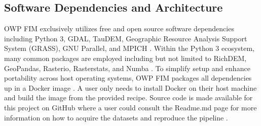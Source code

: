 \documentclass[draft]{dependencies/agujournal2019}
\begin{document}
\subsection{Software Dependencies and Architecture}
\label{ssec:software}
%
OWP FIM exclusively utilizes free and open source software dependencies including Python 3, GDAL, TauDEM, Geographic Resource Analysis Support System (GRASS), GNU Parallel, and MPICH \cite{python382,gdal2020,tarboton2005terrain,grass2020,tange2015gnu,amer2021mpich}.
Within the Python 3 ecosystem, many common packages are employed including but not limited to RichDEM, GeoPandas, Rasterio, Rasterstats, and Numba \cite{barnes2018richdem,jordahl2014geopandas,lam2015numba}. 
To simplify setup and enhance portability across host operating systems, OWP FIM packages all dependencies up in a Docker image \cite{merkel2014docker}. 
A user only needs to install Docker on their host machine and build the image from the provided recipe. 
Source code is made available for this project on GitHub where a user could consult the Readme.md page for more information on how to acquire the datasets and reproduce the pipeline \cite{inundationMapping2022}.
%
\end{document}
